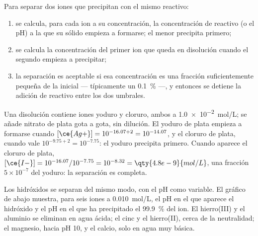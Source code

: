 \begin{method}\label{met:b1:precipitation:selective}
Para separar dos iones que precipitan con el mismo reactivo:
\begin{enumerate}
  \item se calcula, para cada ion a su concentración, la concentración de
        reactivo (o el pH) a la que su sólido empieza a formarse; el
        menor precipita primero;
  \item se calcula la concentración del primer ion que queda en
        disolución cuando el segundo empieza a precipitar;
  \item la separación es aceptable si esa concentración es una fracción
        suficientemente pequeña de la inicial --- típicamente un
        \qty{0.1}{\percent} ---, y entonces se detiene la adición de
        reactivo entre los dos umbrales.
\end{enumerate}
\end{method}

\begin{example}\label{ex:b1:precipitation:i-cl}
Una disolución contiene iones yoduro y cloruro, ambos a
\qty{1.0e-2}{mol/L}; se añade nitrato de plata gota a gota, sin
dilución. El yoduro de plata empieza a formarse cuando
$[\ce{Ag+}] = 10^{-16.07 + 2} =
10^{-14.07}$, y el cloruro de plata, cuando vale $10^{-9.75 + 2} = 10^{-7.75}$:
el yoduro precipita primero. Cuando aparece el cloruro de plata,
$[\ce{I-}] = 10^{-16.07}/10^{-7.75} = 10^{-8.32} = \qty{4.8e-9}{mol/L}$,
una fracción $5 \times 10^{-7}$ del yoduro: la separación es completa.
\end{example}

Los hidróxidos se separan del mismo modo, con el pH como variable. El
gráfico de abajo muestra, para seis iones a \qty{0.010}{mol/L}, el pH en
el que aparece el hidróxido y el pH en el que ha precipitado el
\qty{99.9}{\percent} del ion. El hierro(III) y el aluminio se eliminan en
agua ácida; el cinc y el hierro(II), cerca de la neutralidad; el magnesio,
hacia pH 10, y el calcio, solo en agua muy básica.


